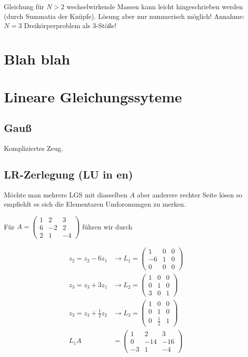 \documentclass[a4paper,ngerman]{scrbook}
\begin{document}
Gleichung für $N>2$ wechselwirkende Massen kann leicht hingeschrieben werden (durch Summatia der Knüpfe). Lösung aber nur nummerisch möglich! Annahme: $N=3$ Dreikörperproblem als 3-Stöße!

\chapter{Blah blah}

\chapter{Lineare Gleichungssyteme}
\section{Gauß}

Kompliziertes Zeug.

\section{LR-Zerlegung (LU in en)}

Möchte man mehrere LGS mit diasselben $A$ aber anderere rechter Seite lösen so empfiehlt es sich die Elementaren Umforomungen zu merken.

Für $A =
\begin{pmatrix}
  1 & 2 & 3\\
  6 & -2 & 2\\
  2 & 1 & -4
\end{pmatrix}
$ führen wir durch

\begin{align*}
z_2 = z_2 - 6z_1 &\to L_1 =
\begin{pmatrix}
  1 & 0 & 0\\
  -6 & 1 & 0\\
  0 & 0 & 0
\end{pmatrix}\\
  z_3 = z_3 + 3z_1 &\to L_2 =
  \begin{pmatrix}
    1 & 0 & 0\\
    0 & 1 & 0\\
    3 & 0 & 1
  \end{pmatrix}\\
  z_3 = z_3 + \frac{1}{2}z_2 &\to L_3 =
  \begin{pmatrix}
    1 & 0 & 0\\
    0 & 1 & 0\\
    0 & \frac{1}{2} & 1
  \end{pmatrix}\\
L_1A &=
\begin{pmatrix}
  1 & 2 & 3\\
  0 & -14 & -16\\
  -3 & 1 & -4
\end{pmatrix}
\end{align*}
\end{document}

